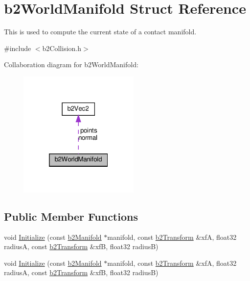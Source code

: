 \hypertarget{structb2WorldManifold}{}\section{b2\+World\+Manifold Struct Reference}
\label{structb2WorldManifold}


This is used to compute the current state of a contact manifold.  




{\ttfamily \#include $<$b2\+Collision.\+h$>$}



Collaboration diagram for b2\+World\+Manifold\+:
\nopagebreak
\begin{figure}[H]
\begin{center}
\leavevmode
\includegraphics[width=169pt]{structb2WorldManifold__coll__graph}
\end{center}
\end{figure}
\subsection*{Public Member Functions}
\begin{DoxyCompactItemize}
\item 
void \hyperlink{structb2WorldManifold_a896dd7e7d4d6f6a5bc69e19fbd6871bd}{Initialize} (const \hyperlink{structb2Manifold}{b2\+Manifold} $\ast$manifold, const \hyperlink{structb2Transform}{b2\+Transform} \&xfA, float32 radiusA, const \hyperlink{structb2Transform}{b2\+Transform} \&xfB, float32 radiusB)
\item 
void \hyperlink{structb2WorldManifold_a896dd7e7d4d6f6a5bc69e19fbd6871bd}{Initialize} (const \hyperlink{structb2Manifold}{b2\+Manifold} $\ast$manifold, const \hyperlink{structb2Transform}{b2\+Transform} \&xfA, float32 radiusA, const \hyperlink{structb2Transform}{b2\+Transform} \&xfB, float32 radiusB)
\end{DoxyCompactItemize}
